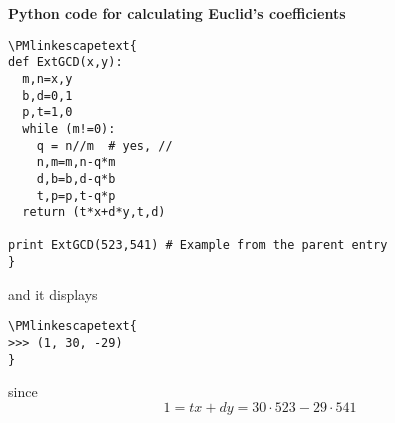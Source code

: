 \documentclass[12pt]{article}
\begin{document}
\textbf{Python code for calculating Euclid's coefficients}

\begin{verbatim}
\PMlinkescapetext{
def ExtGCD(x,y):
  m,n=x,y
  b,d=0,1
  p,t=1,0
  while (m!=0):
    q = n//m  # yes, //
    n,m=m,n-q*m
    d,b=b,d-q*b
    t,p=p,t-q*p
  return (t*x+d*y,t,d)

print ExtGCD(523,541) # Example from the parent entry
}
\end{verbatim}

and it displays

\begin{verbatim}
\PMlinkescapetext{
>>> (1, 30, -29)
}
\end{verbatim}
since 
\[
1=tx +dy = 30\cdot523-29\cdot541
\]
\end{document}
